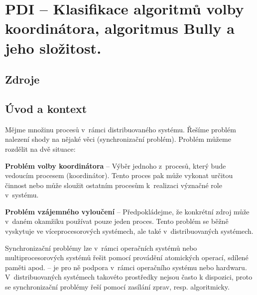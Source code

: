 

\graphicspath{{pdi/volba_koordinatora/figures}}


\chapter{PDI -- Klasifikace algoritmů volby koordinátora, algoritmus Bully a jeho složitost.}
\label{chapter_pdi_koordinator}


\section{Zdroje}

\begin{compactitem}
    \item {}
    \item {}
\end{compactitem}


\section{Úvod a kontext}

\begin{compactitem}
    \item Mějme množinu procesů v~rámci distribuovaného systému. Řešíme problém nalezení shody na nějaké věci (synchronizační problém). Problém můžeme rozdělit na dvě situace: \begin{compactitem}
        \item \textbf{Problém volby koordinátora} -- Výběr jednoho z~procesů, který bude vedoucím procesem (koordinátor). Tento proces pak může vykonat určitou činnost nebo může sloužit ostatním procesům k~realizaci význačné role v~systému.

        \item \textbf{Problém vzájemného vyloučení} -- Předpokládejme, že konkrétní zdroj může v~daném okamžiku používat pouze jeden proces. Tento problém se běžně vyskytuje ve víceprocesorových systémech, ale také v~distribuovaných systémech.
    \end{compactitem}

    \item Synchronizační problémy lze v~rámci operačních systémů nebo multiprocesorových systémů řešit pomocí provádění atomických operací, sdílené paměti apod. -- je pro ně podpora v~rámci operačního systému nebo hardwaru. V~distribuovaných systémech takovéto prostředky nejsou často k dispozici, proto se synchronizační problémy řeší pomocí zasílání zprav, resp. algoritmicky.
\end{compactitem}

